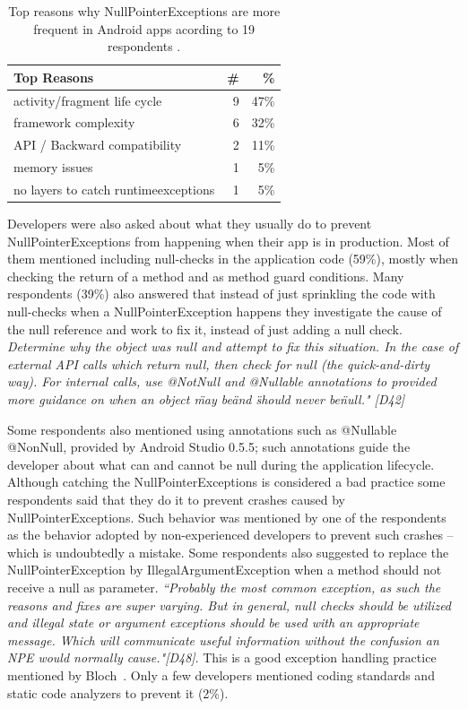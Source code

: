 \begin{table}
\scriptsize
\centering
\begin{tabular}{lrr}
\hline
\bfseries{Top Reasons} & \bfseries{\#} & \bfseries{\%} \\
\hline
activity/fragment life cycle  &	9 &	47\% \\
framework complexity	& 6 &	32\% \\
API / Backward compatibility	& 2 &	11\% \\
memory issues & 	1 &	5\% \\
no layers to catch runtimeexceptions	& 1 &	5\% \\
\hline
\end{tabular}
\caption{Top reasons why NullPointerExceptions are more frequent in Android apps acording to 19 respondents . }
\label{tab:causenull}
\end{table}

Developers were also asked about what they usually do to prevent NullPointerExceptions from happening when their app is in production. Most of them mentioned including null-checks in the application code (59\%), mostly when checking the return of a method and as method guard conditions. Many respondents (39\%) also answered that instead of just sprinkling the code with null-checks when a NullPointerException happens they investigate the cause of the null reference and work to fix it, instead of just adding a null check. \emph{Determine why the object was null and attempt to fix this situation. In the case of external API calls which return null, then check for null (the quick-and-dirty way). For internal calls, use @NotNull and @Nullable annotations to provided more guidance on when an object \"may be\" and \"should never be\" null." [D42]}

Some respondents also mentioned using annotations such as @Nullable @NonNull, provided by Android Studio 0.5.5; such annotations guide the developer about what can and cannot be null during the application lifecycle. Although catching the NullPointerExceptions is considered a bad practice some respondents said that they do it to prevent crashes caused by NullPointerExceptions. Such behavior was mentioned by one of the respondents as the behavior adopted by non-experienced developers  to prevent such crashes -- which is undoubtedly a mistake. Some respondents also suggested to replace the NullPointerException by IllegalArgumentException when a method should not receive a null as parameter. \emph{``Probably the most common exception, as such the reasons and fixes are super varying. But in general, null checks should be utilized and illegal state or argument exceptions should be used with an appropriate message. Which will communicate useful information without the confusion an NPE would normally cause."[D48]}. This is a good exception handling practice mentioned by Bloch~\cite{bloch2008effective}. Only a few developers mentioned coding standards and static code analyzers to prevent it (2\%).



